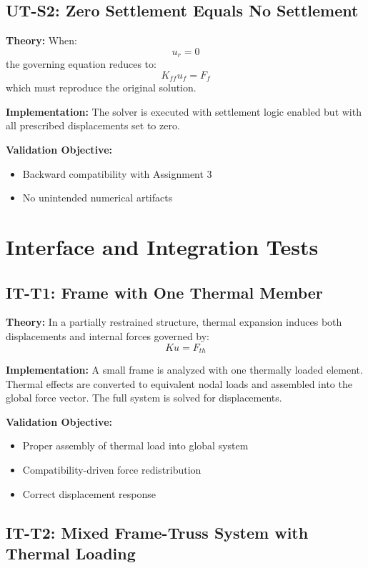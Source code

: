 \subsection{UT-S2: Zero Settlement Equals No Settlement}

\textbf{Theory:}  
When:
\[
u_r = 0
\]
the governing equation reduces to:
\[
K_{ff} u_f = F_f
\]
which must reproduce the original solution.

\textbf{Implementation:}  
The solver is executed with settlement logic enabled but with all prescribed displacements set to zero.

\textbf{Validation Objective:}
\begin{itemize}
    \item Backward compatibility with Assignment 3
    \item No unintended numerical artifacts
\end{itemize}

\section{Interface and Integration Tests}

\subsection{IT-T1: Frame with One Thermal Member}

\textbf{Theory:}  
In a partially restrained structure, thermal expansion induces both displacements and internal forces governed by:
\[
K u = F_{th}
\]

\textbf{Implementation:}  
A small frame is analyzed with one thermally loaded element. Thermal effects are converted to equivalent nodal loads and assembled into the global force vector. The full system is solved for displacements.

\textbf{Validation Objective:}
\begin{itemize}
    \item Proper assembly of thermal load into global system
    \item Compatibility-driven force redistribution
    \item Correct displacement response
\end{itemize}

\subsection{IT-T2: Mixed Frame-Truss System with Thermal Loading}

